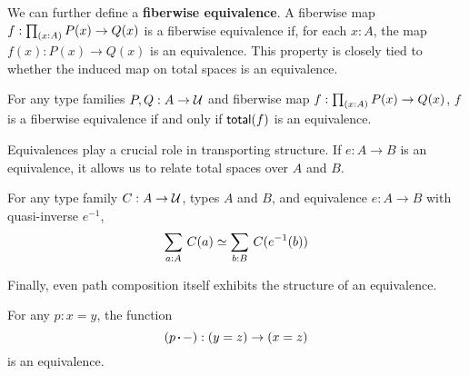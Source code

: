 \documentclass[main.tex]{subfiles}
\begin{document}
We can further define a \textbf{fiberwise equivalence}. A fiberwise map $f : \prd{x:A}P(x) \to Q(x)$ is a fiberwise equivalence if, for each $x:A$, the map $f(x) : P(x) \to Q(x)$ is an equivalence. This property is closely tied to whether the induced map on total spaces is an equivalence.

\begin{lemma}
    \label{lem:equivistotequiv}
    For any type families $P,Q : A \to \mathcal{U}$ and fiberwise map $f : \prd{x:A}P(x)\to Q(x)$, $f$ is a fiberwise equivalence if and only if
    $\normalfont \mathsf{total}(f)$ is an equivalence.
\end{lemma}
Equivalences play a crucial role in transporting structure. If $e : A \to B$ is an equivalence, it allows us to relate total spaces over $A$ and $B$.
\begin{lemma}
    \label{lem:equivbaseequivtot}
    For any type family $C : A \to \mathcal{U}$, types $A$ and $B$, and equivalence $e : A \to B$ with quasi-inverse $e^{-1}$, 
    \begin{equation}
        \sm{a : A}C(a) \simeq \sm{b:B}C(e^{-1}(b))
    \end{equation}
\end{lemma}

Finally, even path composition itself exhibits the structure of an equivalence.
\begin{lemma}
    \label{lem:compisequiv}
    For any $p : x = y$, the function
    \begin{equation}
        (p \sq -) : (y = z) \to (x = z)
    \end{equation}
    is an equivalence.
\end{lemma}
\end{document}
